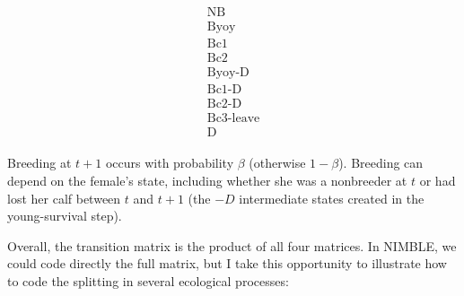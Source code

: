 \documentclass[
  12pt,
]{krantz}
\begin{document}
\[\begin{matrix}
\begin{matrix}
\text{NB} \\
\text{Byoy} \\
\text{Bc1} \\
\text{Bc2} \\
\text{Byoy-D} \\
\text{Bc1-D} \\
\text{Bc2-D} \\
\text{Bc3-leave} \\
\text{D}
\end{matrix}
\end{matrix}
\]

Breeding at \(t+1\) occurs with probability \(\beta\) (otherwise \(1−\beta\)). Breeding can depend on the female's state, including whether she was a nonbreeder at \(t\) or had lost her calf between \(t\) and \(t+1\) (the \(−D\) intermediate states created in the young-survival step).

Overall, the transition matrix is the product of all four matrices. In NIMBLE, we could code directly the full matrix, but I take this opportunity to illustrate how to code the splitting in several ecological processes:
\end{document}
